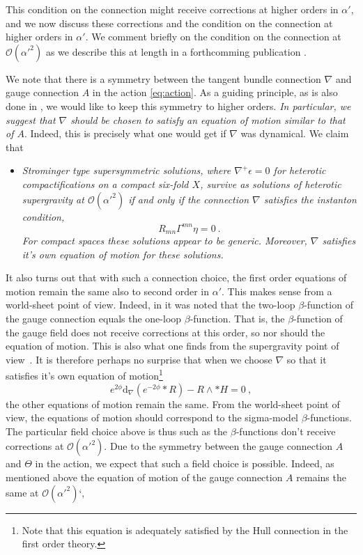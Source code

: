 \documentclass[12pt,a4paper]{article}
\def\a{\alpha'}
\def\d{\textrm{d}}
\def\OO{\mathcal{O}}
\theoremstyle{definition}
\begin{document}
This condition on the connection might receive corrections at higher orders in $\a$, and we now discuss these corrections and the condition on the connection at higher orders in $\a$. We comment briefly on the condition on the connection at $\OO(\a^2)$ as we describe this at length in a forthcomming publication \citep{delaossa2014}.

We note that there is a symmetry between the tangent bundle connection $\nabla$ and gauge connection $A$ in the action \eqref{eq:action}.  As a guiding principle, as is also done in \cite{Bergshoeff1989439}, we would like to keep this symmetry to higher orders. {\it In particular, we suggest that $\nabla$ should be chosen to satisfy an equation of motion similar to that of $A$}. Indeed, this is precisely what one would get  if $\nabla$ was dynamical.
We claim that 
\begin{itemize}
\label{tm:inst}
\item{\it
Strominger type supersymmetric solutions, where $\nabla^+\epsilon=0$ for heterotic compactifications on a compact six-fold $X$, survive as solutions of heterotic supergravity at $\OO(\a^2)$ if and only if the connection $\nabla$ satisfies the instanton condition,
\begin{equation*}
R_{mn}\Gamma^{mn}\eta=0\:.
\end{equation*}
For compact spaces these solutions appear to be generic. Moreover, $\nabla$ satisfies it's own equation of motion for these solutions.}
\end{itemize}
It also turns out that with such a connection choice, the first order equations of motion remain the same also to second order in $\a$. This makes sense from a world-sheet point of view. Indeed, in \cite{Foakes1988335} it was noted that the two-loop $\beta$-function of the gauge connection equals the one-loop $\beta$-function. That is, the $\beta$-function of the gauge field does not receive corrections at this order, so nor should the equation of motion. This is also what one finds from the supergravity point of view~\citep{Bergshoeff1989439}. It is therefore perhaps no surprise that when we choose $\nabla$ so that it satisfies it's own equation of motion\footnote{Note that this equation is adequately satisfied by the Hull connection in the first order theory.}
\begin{equation*}
e^{2\phi}\d_\nabla(e^{-2\phi}*R)-R\wedge*H=0~,
\end{equation*}
the other equations of motion remain the same. From the world-sheet point of view, the equations of motion should correspond to the sigma-model $\beta$-functions. The particular field choice above is thus such as the $\beta$-functions don't receive corrections at $\OO(\a^2)$. Due to the symmetry between the gauge connection $A$ and $\Theta$ in the action, we expect that such a field choice is possible. Indeed, as mentioned above the equation of motion of the gauge connection $A$ remains the same at $\OO(\a^2)$`\citep{Bergshoeff1989439},
\end{document}
